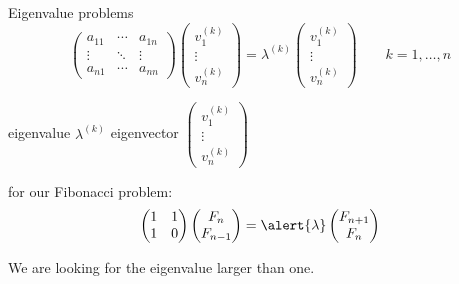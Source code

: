 \documentclass[svgnames]{beamer}
\begin{document}
\begin{frame}{Eigenvalue problems}
 \begin{displaymath}
  \begin{pmatrix}
   a_{11} & \cdots & a_{1n} \\
   \vdots & \ddots & \vdots \\
   a_{n1} & \cdots & a_{nn}
  \end{pmatrix}\begin{pmatrix}
   v_1^{(k)} \\ \vdots \\ v_n^{(k)}
  \end{pmatrix} = \lambda^{(k)}
  \begin{pmatrix}
   v_1^{(k)} \\ \vdots \\ v_n^{(k)}
  \end{pmatrix}\qquad k=1,\ldots, n
 \end{displaymath}

 \begin{center}
  eigenvalue $\lambda^{(k)}$\qquad\qquad
  eigenvector $\begin{pmatrix}v_1^{(k)}\\\vdots\\v_n^{(k)}\end{pmatrix}$
 \end{center}

 for our Fibonacci problem:
   \begin{displaymath}
    \begin{pmatrix} 1 & 1 \\ 1 & 0 \end{pmatrix} 
    \begin{pmatrix} F_n \\ F_{n-1} \end{pmatrix} =
    \alert{\lambda}\begin{pmatrix} F_{n+1} \\ F_n \end{pmatrix}
   \end{displaymath}

 We are looking for the eigenvalue larger than one.
\end{frame}
\end{document}
